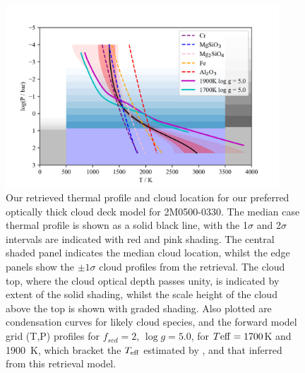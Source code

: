 \documentclass[useAMS,usenatbib]{mn2e}
\begin{document}
\begin{figure}
\hspace{-0.8cm}\includegraphics[width=290pt]{2M0500_profile_2sigma_ucl.png}
\caption{Our retrieved thermal profile and cloud location for our preferred optically thick cloud deck model for 2M0500-0330. The median case thermal profile is shown as a solid black line, with the 1$\sigma$  and 2$\sigma$ intervals are indicated with red and pink shading. The central shaded panel indicates the median cloud location, whilst the edge panels show the $\pm 1\sigma$ cloud profiles from the retrieval. The cloud top, where the cloud optical depth passes unity, is indicated by extent of the solid shading, whilst the scale height of the cloud above the top is shown with graded shading. Also plotted are condensation curves for likely cloud species, and the forward model grid (T,P) profiles for $f_{sed} = 2$, $\log g = 5.0$,  for $T{\rm eff} =  1700$K and 1900~K, which bracket the $T_{\rm eff}$ estimated by \citet{filippazzo2015}, and that inferred from this retrieval model.
\label{fig:2m0500thickprof}}
\end{figure}
\end{document}
